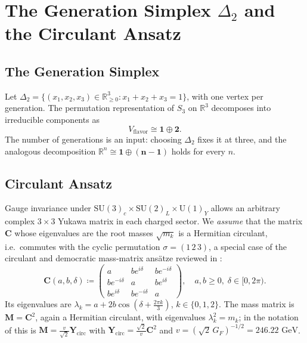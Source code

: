 \documentclass[11pt,reqno]{amsart}
\theoremstyle{definition}
\newcommand{\R}{\mathbb{R}}
\newcommand{\SU}{\mathrm{SU}}
\newcommand{\U}{\mathrm{U}}
\begin{document}
\section{The Generation Simplex \texorpdfstring{$\Delta_2$}{Delta 2} and the Circulant Ansatz}

\subsection{The Generation Simplex}
Let $\Delta_2 = \{(x_1, x_2, x_3) \in \mathbb{R}_{\ge 0}^3 : x_1 + x_2 + x_3 = 1\}$, with one vertex per generation. The permutation representation of $S_3$ on $\R^3$ decomposes into irreducible components as
\begin{equation}
    V_{\mathrm{flavor}} \cong \mathbf{1} \oplus \mathbf{2}.
\end{equation}
The number of generations is an input: choosing $\Delta_2$ fixes it at three, and the analogous decomposition $\R^n \cong \mathbf{1} \oplus (\mathbf{n-1})$ holds for every $n$.

\subsection{Circulant Ansatz}
Gauge invariance under $\SU(3)_c \times \SU(2)_L \times \U(1)_Y$ allows an arbitrary complex $3\times3$ Yukawa matrix in each charged sector. We \emph{assume} that the matrix $\mathbf{C}$ whose eigenvalues are the root masses $\sqrt{m_k}$ is a Hermitian circulant, i.e.\ commutes with the cyclic permutation $\sigma = (1\,2\,3)$, a special case of the circulant and democratic mass-matrix ansätze reviewed in \cite{fritzsch2000mass}:
\begin{equation}\label{eq:circulant_Y}
    \mathbf{C}(a, b, \delta) \coloneqq \begin{pmatrix}
        a & b e^{i\delta} & b e^{-i\delta} \\
        b e^{-i\delta} & a & b e^{i\delta} \\
        b e^{i\delta} & b e^{-i\delta} & a
    \end{pmatrix}, \quad a, b \ge 0, \; \delta \in [0, 2\pi).
\end{equation}
Its eigenvalues are $\lambda_k = a + 2b \cos\left( \delta + \frac{2\pi k}{3} \right)$, $k \in \{0, 1, 2\}$. The mass matrix is $\mathbf{M} = \mathbf{C}^2$, again a Hermitian circulant, with eigenvalues $\lambda_k^2 = m_k$; in the notation of \cite[Ch.~12, Sec.~7]{silvafilho2026book} this is $\mathbf{M} = \frac{v}{\sqrt2}\mathbf{Y}_{\mathrm{circ}}$ with $\mathbf{Y}_{\mathrm{circ}} = \frac{\sqrt2}{v}\mathbf{C}^2$ and $v = (\sqrt2\,G_F)^{-1/2} = 246.22\text{ GeV}$.
\end{document}
